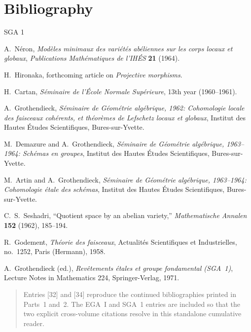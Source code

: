 \clearpage
{}
{}
\section*{Bibliography}

\begin{thebibliography}{SGA 1}

A.~N\'eron, \emph{Mod\`eles minimaux des vari\'et\'es ab\'eliennes sur les
corps locaux et globaux}, \emph{Publications Math\'ematiques de l'IH\'ES}
\textbf{21} (1964).

H.~Hironaka, forthcoming article on \emph{Projective morphisms}.

H.~Cartan, \emph{S\'eminaire de l'\'Ecole Normale Sup\'erieure},
13th year (1960--1961).

A.~Grothendieck, \emph{S\'eminaire de G\'eom\'etrie alg\'ebrique, 1962:
Cohomologie locale des faisceaux coh\'erents, et th\'eor\`emes de Lefschetz
locaux et globaux}, Institut des Hautes \'Etudes Scientifiques,
Bures-sur-Yvette.

M.~Demazure and A.~Grothendieck, \emph{S\'eminaire de G\'eom\'etrie
alg\'ebrique, 1963--1964: Sch\'emas en groupes}, Institut des Hautes
\'Etudes Scientifiques, Bures-sur-Yvette.

M.~Artin and A.~Grothendieck, \emph{S\'eminaire de G\'eom\'etrie
alg\'ebrique, 1963--1964: Cohomologie \'etale des sch\'emas}, Institut des
Hautes \'Etudes Scientifiques, Bures-sur-Yvette.

C.~S.~Seshadri, ``Quotient space by an abelian variety,''
\emph{Mathematische Annalen} \textbf{152} (1962), 185--194.

R.~Godement, \emph{Th\'eorie des faisceaux}, Actualit\'es Scientifiques et
Industrielles, no.~1252, Paris (Hermann), 1958.

A.~Grothendieck (ed.), \emph{Rev\^etements \'etales et groupe fondamental
(SGA~1)}, Lecture Notes in Mathematics 224, Springer-Verlag, 1971.

\end{thebibliography}

\begin{quote}\footnotesize
Entries [32] and [34] reproduce the continued bibliographies printed in
Parts~1 and~2. The EGA~I and SGA~1 entries are included so that the two
explicit cross-volume citations resolve in this standalone cumulative reader.
\end{quote}

